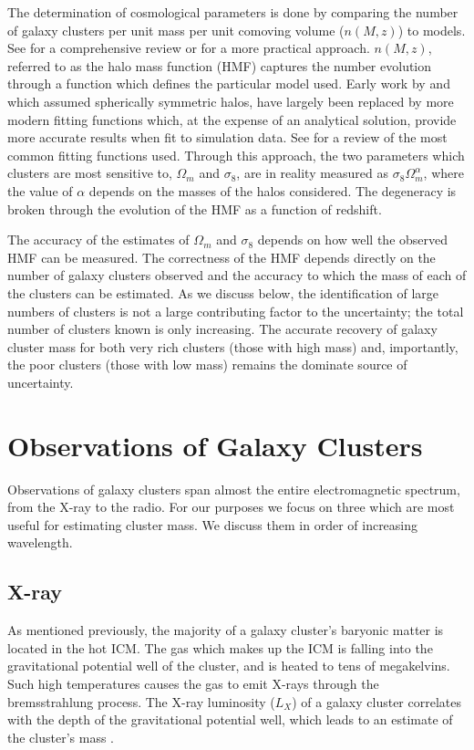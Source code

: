 The determination of cosmological parameters is done by comparing the number of galaxy clusters per unit mass per unit comoving volume ($n(M,z)$) to models. See \cite{Allen2011} for a comprehensive review or \cite{Murray2013} for a more practical approach. $n(M,z)$, referred to as the halo mass function (HMF) captures the number evolution through a function which defines the particular model used. Early work by \cite{Press1974} and \cite{Bond1991} which assumed spherically symmetric halos, have largely been replaced by more modern fitting functions which, at the expense of an analytical solution, provide more accurate results when fit to simulation data. See \cite{Murray2013} for a review of the most common fitting functions used. Through this approach, the two parameters which clusters are most sensitive to, $\Omega_m$ and $\sigma_8$, are in reality measured as $\sigma_8\Omega_m^\alpha$, where the value of $\alpha$ depends on the masses of the halos considered. The degeneracy is broken through the evolution of the HMF as a function of redshift. 

The accuracy of the estimates of $\Omega_m$ and $\sigma_8$ depends on how well the observed HMF can be measured. The correctness of the HMF depends directly on the number of galaxy clusters observed and the accuracy to which the mass of each of the clusters can be estimated. As we discuss below, the identification of large numbers of clusters is not a large contributing factor to the uncertainty; the total number of clusters known is only increasing. The accurate recovery of galaxy cluster mass for both very rich clusters (those with high mass) and, importantly, the poor clusters (those with low mass) remains the dominate source of uncertainty.

\section{Observations of Galaxy Clusters}
Observations of galaxy clusters span almost the entire electromagnetic spectrum, from the X-ray to the radio. For our purposes we focus on three which are most useful for estimating cluster mass. We discuss them in order of increasing wavelength.

\subsection{X-ray}
As mentioned previously, the majority of a galaxy cluster's baryonic matter is located in the hot ICM. The gas which makes up the ICM is falling into the gravitational potential well of the cluster, and is heated to tens of megakelvins. Such high temperatures causes the gas to emit X-rays through the bremsstrahlung process. The X-ray luminosity ($L_X$) of a galaxy cluster correlates with the depth of the gravitational potential well, which leads to an estimate of the cluster's mass . 

